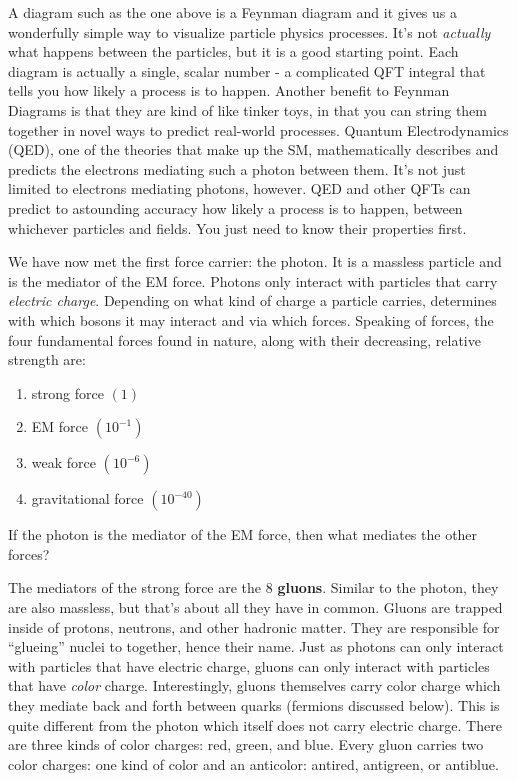 A diagram such as the one above is a Feynman diagram and it gives us a wonderfully simple way to visualize particle physics processes.
It's not \emph{actually} what happens between the particles, but it is a good starting point.
Each diagram is actually a single, scalar number -
a complicated QFT integral that tells you how likely a process is to happen.
Another benefit to Feynman Diagrams is that they are kind of like tinker toys, 
in that you can string them together in novel ways to predict real-world processes.
Quantum Electrodynamics (QED), one of the theories that make up the SM, mathematically describes and predicts the electrons mediating such a photon between them. 
It's not just limited to electrons mediating photons, however.
QED and other QFTs can predict to astounding accuracy how likely a process is to happen, between whichever particles and fields. 
You just need to know their properties first.

We have now met the first force carrier: the photon.
It is a massless particle and is the mediator of the EM force. 
Photons only interact with particles that carry \emph{electric charge}.
Depending on what kind of charge a particle carries, determines with which bosons it may interact and via which forces.
Speaking of forces, the four fundamental forces found in nature, along with their decreasing, relative strength are: 
\begin{enumerate}
    \item strong force $(1)$
    \item EM force $(10^{-1})$
    \item weak force $(10^{-6})$
    \item gravitational force $(10^{-40})$
\end{enumerate}
If the photon is the mediator of the EM force, then what mediates the other forces?

The mediators of the strong force are the 8 {\bf gluons}. 
Similar to the photon, they are also massless, but that's about all they have in common. 
Gluons are trapped inside of protons, neutrons, and other hadronic matter. 
They are responsible for ``glueing'' nuclei to together, hence their name.
Just as photons can only interact with particles that have electric charge, gluons can only interact with particles that have \emph{color} charge.
Interestingly, gluons themselves carry color charge which they mediate back and forth between quarks (fermions discussed below).
This is quite different from the photon which itself does not carry electric charge. 
There are three kinds of color charges: red, green, and blue.
Every gluon carries two color charges:
one kind of color and an anticolor: antired, antigreen, or antiblue.

